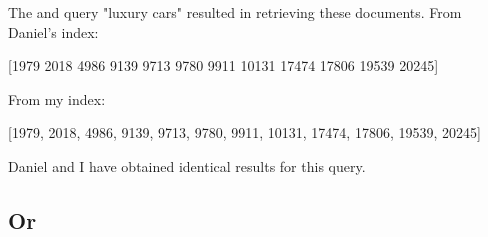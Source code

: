 \par The and query "luxury cars" resulted in retrieving these documents.
From Daniel's index:
\begin{center}
    [1979 2018 4986 9139 9713 9780 9911 10131 17474 17806 19539 20245]
\end{center}
From my index:
\begin{center}
    [1979, 2018, 4986, 9139, 9713, 9780, 9911, 10131, 17474, 17806, 19539, 20245]
\end{center}
\par Daniel and I have obtained identical results for this query.

\subsection{Or}


